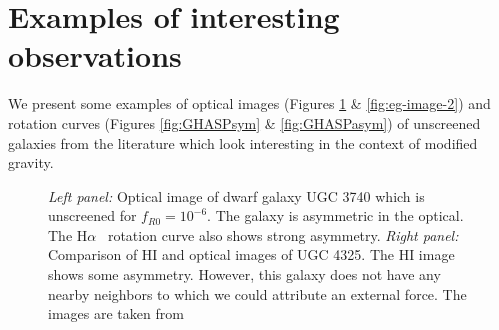 \documentclass[twocolappendix, numberedappendix]{emulateapj}
\newcommand{\ha}{H$\alpha$}
\begin{document}
\section{Examples of interesting observations}
\label{ap:curves}
We present some examples of optical images (Figures \ref{fig:eg-image-1} \&
\ref{fig:eg-image-2}) and rotation curves (Figures \ref{fig:GHASPsym} \&
\ref{fig:GHASPasym}) of unscreened galaxies from the literature which look
interesting in the context of modified gravity. 


\begin{figure}
\caption{{\it Left panel:} Optical image of dwarf galaxy UGC 3740 which is
unscreened for $f_{R0}=10^{-6}$. The galaxy is asymmetric in the optical. The \ha~
rotation curve also shows strong asymmetry. 
{\it Right panel:} Comparison of HI and optical images of UGC 4325. The HI
image shows some asymmetry. However, this galaxy does not have any nearby neighbors to which we could attribute an external force. The images are taken from \citet{figgs2008,swaters2002b}
\label{fig:eg-image-1}}
\end{figure}
\end{document}
